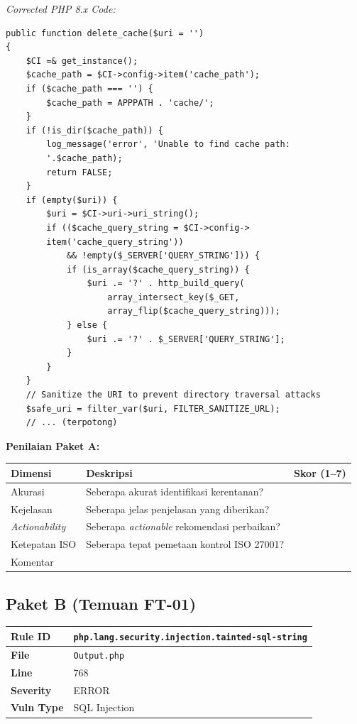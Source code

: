 \textit{Corrected PHP 8.x Code:}
\begin{small}
\begin{lstlisting}[style=promptstyle]
public function delete_cache($uri = '')
{
    $CI =& get_instance();
    $cache_path = $CI->config->item('cache_path');
    if ($cache_path === '') {
        $cache_path = APPPATH . 'cache/';
    }
    if (!is_dir($cache_path)) {
        log_message('error', 'Unable to find cache path: 
        '.$cache_path);
        return FALSE;
    }
    if (empty($uri)) {
        $uri = $CI->uri->uri_string();
        if (($cache_query_string = $CI->config->
        item('cache_query_string'))
            && !empty($_SERVER['QUERY_STRING'])) {
            if (is_array($cache_query_string)) {
                $uri .= '?' . http_build_query(
                    array_intersect_key($_GET,
                    array_flip($cache_query_string)));
            } else {
                $uri .= '?' . $_SERVER['QUERY_STRING'];
            }
        }
    }
    // Sanitize the URI to prevent directory traversal attacks
    $safe_uri = filter_var($uri, FILTER_SANITIZE_URL);
    // ... (terpotong)
\end{lstlisting}
\end{small}

\textbf{Penilaian Paket A:}

\begin{center}
\renewcommand{\arraystretch}{1.6}
\begin{tabular}{|l|p{7.5cm}|c|}
\hline
\textbf{Dimensi} & \textbf{Deskripsi} & \textbf{Skor (1--7)} \\
\hline
Akurasi & Seberapa akurat identifikasi kerentanan? & \\
\hline
Kejelasan & Seberapa jelas penjelasan yang diberikan? & \\
\hline
\textit{Actionability} & Seberapa \textit{actionable} rekomendasi perbaikan? & \\
\hline
Ketepatan ISO & Seberapa tepat pemetaan kontrol ISO 27001? & \\
\hline
\multicolumn{2}{|l|}{Komentar} & \\
\hline
\end{tabular}
\end{center}

\subsection*{Paket B (Temuan FT-01)}

\begin{center}
\renewcommand{\arraystretch}{1.3}
\begin{tabular}{|l|l|}
\hline
\textbf{Rule ID} &
  \texttt{php.lang.security.injection.tainted-sql-string} \\
\hline
\textbf{File} & \texttt{Output.php} \\
\hline
\textbf{Line} & 768 \\
\hline
\textbf{Severity} & ERROR \\
\hline
\textbf{Vuln Type} & SQL Injection \\
\hline
\end{tabular}
\end{center}

